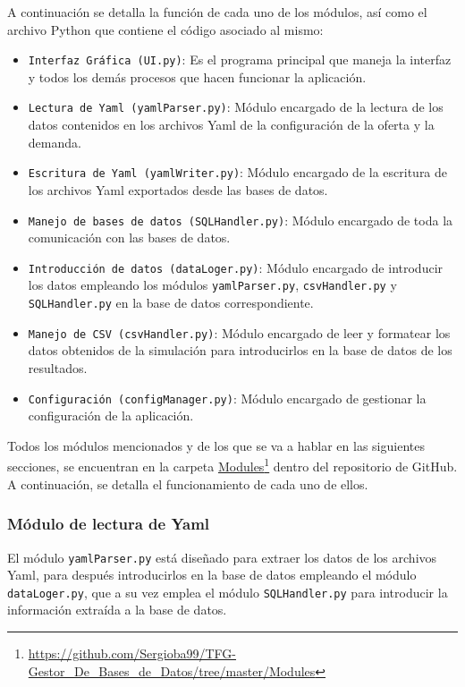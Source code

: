 A continuación se detalla la función de cada uno de los módulos, así como el archivo Python que contiene el código asociado al mismo:
\begin{itemize}
    \item \texttt{Interfaz Gráfica (UI.py)}: Es el programa principal que maneja la interfaz y todos los demás procesos que hacen funcionar la aplicación.
    \item \texttt{Lectura de Yaml (yamlParser.py)}: Módulo encargado de la lectura  de los datos contenidos en los archivos Yaml de la configuración de la oferta y la demanda.
    \item \texttt{Escritura de Yaml (yamlWriter.py)}: Módulo encargado de la escritura de los archivos Yaml exportados desde las bases de datos.
    \item \texttt{Manejo de bases de datos (SQLHandler.py)}: Módulo encargado de toda la comunicación con las bases de datos.
    \item \texttt{Introducción de datos (dataLoger.py)}: Módulo encargado de introducir los datos empleando los módulos \texttt{yamlParser.py}, \texttt{csvHandler.py} y \texttt{SQLHandler.py} en la base de datos correspondiente. 
    \item \texttt{Manejo de CSV (csvHandler.py)}: Módulo encargado de leer y formatear los datos obtenidos de la simulación para introducirlos en la base de datos de los resultados.
    \item \texttt{Configuración (configManager.py)}: Módulo encargado de gestionar la configuración de la aplicación.
\end{itemize}

Todos los módulos mencionados y de los que se va a hablar en las siguientes secciones, se encuentran en la carpeta \href{https://github.com/Sergioba99/TFG-Gestor_De_Bases_de_Datos/tree/master/Modules}{Modules}\footnote{\url{https://github.com/Sergioba99/TFG-Gestor\_De\_Bases\_de\_Datos/tree/master/Modules}} dentro del repositorio de GitHub. A continuación, se detalla el funcionamiento de cada uno de ellos.

\subsubsection{Módulo de lectura de Yaml}

El módulo \texttt{yamlParser.py} está diseñado para extraer los datos de los archivos Yaml, para después introducirlos en la base de datos empleando el módulo \texttt{dataLoger.py}, que a su vez emplea el módulo \texttt{SQLHandler.py} para introducir la información extraída a la base de datos.

